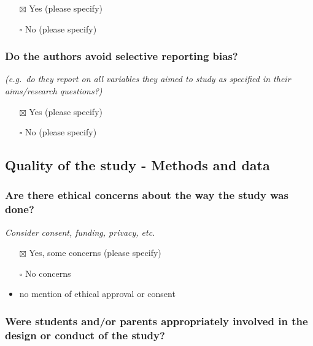 \documentclass[
  doc, a4paper]{apa7}
\providecommand{\tightlist}{%
  \setlength{\itemsep}{0pt}\setlength{\parskip}{0pt}}
\begin{document}
\begin{itemize}
\tightlist
\item[$\boxtimes$]
  Yes (please specify)
\item[$\square$]
  No (please specify)
\end{itemize}

\subsubsection{Do the authors avoid selective reporting bias?}\label{do-the-authors-avoid-selective-reporting-bias}

\emph{(e.g.~do they report on all variables they aimed to study as specified in their aims/research questions?)}

\begin{itemize}
\tightlist
\item[$\boxtimes$]
  Yes (please specify)
\item[$\square$]
  No (please specify)
\end{itemize}

\subsection{Quality of the study - Methods and data}\label{quality-of-the-study---methods-and-data}

\subsubsection{Are there ethical concerns about the way the study was done?}\label{are-there-ethical-concerns-about-the-way-the-study-was-done}

\emph{Consider consent, funding, privacy, etc.}

\begin{itemize}
\item[$\boxtimes$]
  Yes, some concerns (please specify)
\item[$\square$]
  No concerns
\item
  no mention of ethical approval or consent
\end{itemize}

\subsubsection{Were students and/or parents appropriately involved in the design or conduct of the study?}\label{were-students-andor-parents-appropriately-involved-in-the-design-or-conduct-of-the-study}
\end{document}
